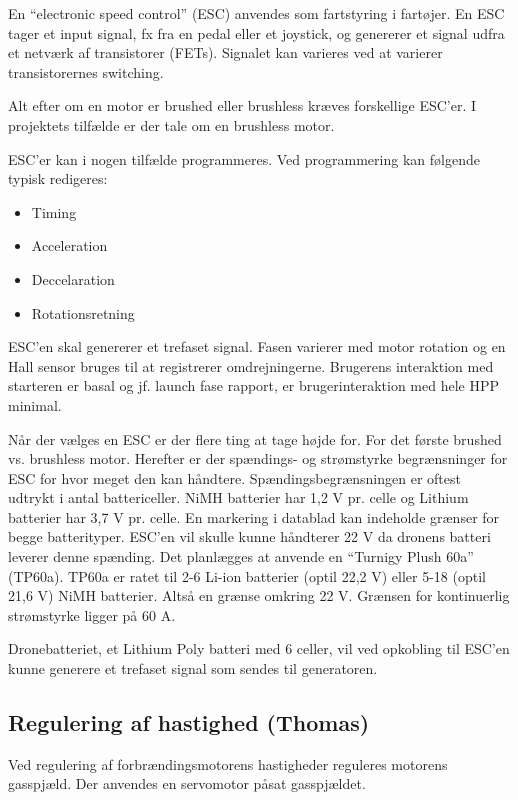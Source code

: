 En ``electronic speed control'' (ESC) anvendes som fartstyring i fartøjer. En ESC tager et input signal, fx fra en pedal eller et joystick, og genererer et signal udfra et netværk af transistorer (FETs). Signalet kan varieres ved at varierer transistorernes switching.

Alt efter om en motor er brushed eller brushless kræves forskellige ESC'er. I projektets tilfælde er der tale om en brushless motor. 

ESC'er kan i nogen tilfælde programmeres. Ved programmering kan følgende typisk redigeres:
\begin{itemize}
\item Timing
\item Acceleration
\item Deccelaration
\item Rotationsretning
\end{itemize}

ESC'en skal genererer et trefaset signal. Fasen varierer med motor rotation og en Hall sensor bruges til at registrerer omdrejningerne. Brugerens interaktion med starteren er basal og jf. launch fase rapport, er brugerinteraktion med hele HPP minimal.

Når der vælges en ESC er der flere ting at tage højde for. For det første brushed vs. brushless motor. Herefter er der spændings- og strømstyrke begrænsninger for ESC for hvor meget den kan håndtere. Spændingsbegrænsningen er oftest udtrykt i antal battericeller. NiMH batterier har 1,2 V pr. celle og Lithium batterier har 3,7 V pr. celle. En markering i datablad kan indeholde grænser for begge batterityper. ESC'en vil skulle kunne håndterer 22 V da dronens batteri leverer denne spænding. Det planlægges at anvende  en ``Turnigy Plush 60a'' (TP60a). TP60a er ratet til 2-6 Li-ion batterier (optil 22,2 V) eller 5-18 (optil 21,6 V) NiMH batterier. Altså en grænse omkring 22 V. Grænsen for kontinuerlig strømstyrke ligger på 60 A.

Dronebatteriet, et Lithium Poly batteri med 6 celler, vil ved opkobling til ESC'en kunne generere et trefaset signal som sendes til generatoren.

\subsection{Regulering af hastighed (Thomas)}
\label{sec:regul-af-hast}

Ved regulering af forbrændingsmotorens hastigheder reguleres motorens gasspjæld. Der anvendes en servomotor påsat gasspjældet.

